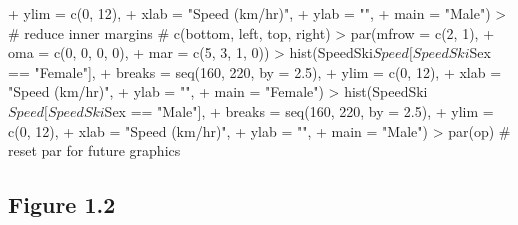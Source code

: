 \documentclass[12pt,letterpaper,final]{article}
\begin{document}
\begin{Schunk}
\begin{Sinput}
+      ylim = c(0, 12),
+      xlab = "Speed (km/hr)",
+      ylab = "",
+      main = "Male")
> # reduce inner margins # c(bottom, left, top, right)
> par(mfrow = c(2, 1),
+     oma = c(0, 0, 0, 0),
+     mar = c(5, 3, 1, 0))
> hist(SpeedSki$Speed[SpeedSki$Sex == "Female"],
+      breaks = seq(160, 220, by = 2.5),
+      ylim = c(0, 12),
+      xlab = "Speed (km/hr)",
+      ylab = "",
+      main = "Female")
> hist(SpeedSki$Speed[SpeedSki$Sex == "Male"],
+      breaks = seq(160, 220, by = 2.5),
+      ylim = c(0, 12),
+      xlab = "Speed (km/hr)",
+      ylab = "",
+      main = "Male")
> par(op) # reset par for future graphics 
\end{Sinput}
\end{Schunk}


\subsection{Figure 1.2}
\end{document}

